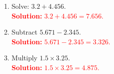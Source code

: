 \documentclass[12pt]{article}
\begin{document}
\begin{tcolorbox}[colframe=black!60, colback=white, 
coltitle=black, colbacktitle=black!15, fonttitle=\bfseries\Large, 
title=Exercises, halign title=center, left=10pt, right=10pt, top=10pt, bottom=60pt]
\begin{enumerate}[itemsep=3em]
    \item Solve: \( 3.2 + 4.456 \).\\
    \textcolor{red}{\textbf{Solution:} \( 3.2 + 4.456 = 7.656 \).}

    \item Subtract \( 5.671 - 2.345 \).\\
    \textcolor{red}{\textbf{Solution:} \( 5.671 - 2.345 = 3.326 \).}

    \item Multiply \( 1.5 \times 3.25 \).\\
    \textcolor{red}{\textbf{Solution:} \( 1.5 \times 3.25 = 4.875 \).}
\end{enumerate}
\end{tcolorbox}

\vspace{1em}
\end{document}
